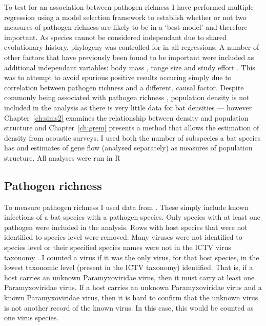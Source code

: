 To test for an association between pathogen richness I have performed multiple regression using a model selection framework to establish whether or not two measures of pathogen richness are likely to be in a `best model' and therefore important.
As species cannot be considered independant due to shared evolutionary history, phylogeny was controlled for in all regressions.
A number of other factors that have previously been found to be important were included as additional independant variables: body mass \cite{kamiya2014determines, turmelle2009correlates, gay2014parasite, maganga2014bat, han2015infectious}, range size \cite{kamiya2014determines, turmelle2009correlates, maganga2014bat} and study effort \cite{turmelle2009correlates, gay2014parasite, maganga2014bat}.
This was to attempt to avoid spurious positive results occuring simply due to correlation between pathogen richness and a different, causal factor.
Despite commonly being associated with pathogen richness \cite{arneberg2002host, kamiya2014determines, nunn2003comparative}, population density is not included in the analysis as there is very little data for bat densities --- however Chapter~\ref{ch:sims2} examines the relationship between density and population structure and Chapter~\ref{ch:grem} presents a method that allows the estimation of density from acoustic surveys.
I used both the number of subspecies a bat species has and estimates of gene flow (analysed separately) as measures of population structure.
All analyses were run in R \cite{R}

\subsection{Pathogen richness}

To measure pathogen richness I used data from \cite{luis2013comparison}. 
These simply include known infections of a bat species with a pathogen species. 
Only species with at least one pathogen were included in the analysis.
Rows with host species that were not identified to species level were removed.
Many viruses were not identified to species level or their specified species names were not in the ICTV virus taxonomy \cite{ICTV}.
I counted a virus if it was the only virus, for that host species, in the lowest taxonomic level (present in the ICTV taxonomy) identified.
That is, if a host carries an unknown Paramyxoviridae virus, then it must carry at least one Paramyxoviridae virus.
If a host carries an unknown Paramyxoviridae virus and a known Paramyxoviridae virus, then it is hard to confirm that the unknown virus is not another record of the known virus.
In this case, this would be counted as one virus species.






